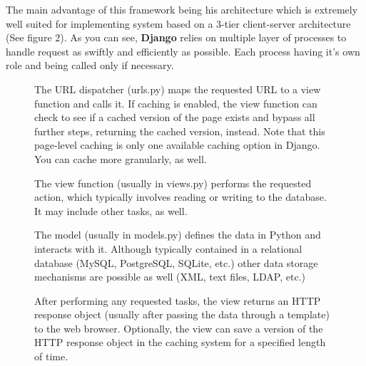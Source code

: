 The main advantage of this framework being his architecture which is extremely well suited for implementing system based on a 3-tier client-server architecture (See figure 2). As you can see, \textbf{Django} relies on multiple layer of processes to handle request as swiftly and efficiently as possible. Each process having it's own role and being called only if necessary.  \newline

\begin{enumerate}
\begin{figure}
    \begin{minipage}{\linewidth}
        \centering
        \begin{minipage}{0.45\linewidth}
                \item The URL dispatcher (urls.py) maps the requested URL
                    to a view function and calls it. If caching is enabled,
                    the view function can check to see if a cached version
                    of the page exists and bypass all further steps,
                    returning the cached version, instead. Note that this
                    page-level caching is only one available caching option
                    in Django. You can cache more granularly, as well.
                \item The view function (usually in views.py) performs the
                    requested action, which typically involves reading or
                    writing to the database. It may include other tasks, as
                    well.
                \item The model (usually in models.py) defines the data in
                    Python and interacts with it. Although typically
                    contained in a relational database (MySQL, PostgreSQL,
                    SQLite, etc.) other data storage mechanisms are
                    possible as well (XML, text files, LDAP, etc.)
                \item After performing any requested tasks, the view
                    returns an HTTP response object (usually after passing
                    the data through a template) to the web browser.
                    Optionally, the view can save a version of the HTTP
                    response object in the caching system for a specified
                    length of time.
        \end{minipage}
        \begin{minipage}{0.05\linewidth}
            \vline
        \end{minipage}

\end{minipage}
\end{figure}
\end{enumerate}
